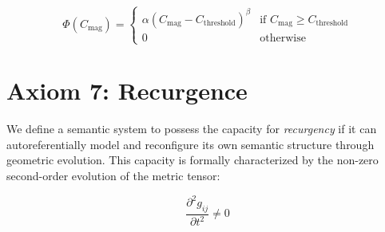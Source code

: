\begin{equation}
\Phi(C_{\text{mag}}) = \begin{cases}
\alpha (C_{\text{mag}} - C_{\text{threshold}})^{\beta} & \text{if } C_{\text{mag}} \geq C_{\text{threshold}} \\
0 & \text{otherwise}
\end{cases}
\end{equation}


\section{Axiom 7: Recurgence}\label{axiom_7}

We define a semantic system to possess the capacity for \textit{recurgency} if it can autoreferentially model and reconfigure its own semantic structure through geometric evolution. This capacity is formally characterized by the non-zero second-order evolution of the metric tensor:

\begin{equation}
\frac{\partial^2 g_{ij}}{\partial t^2} \neq 0
\end{equation} 